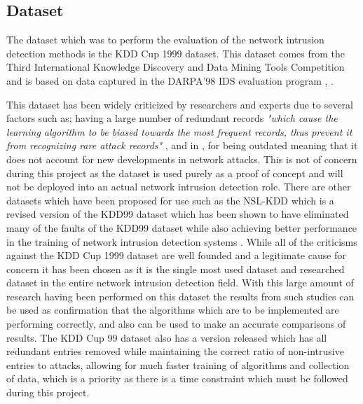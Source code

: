 	\subsection{Dataset}
	The dataset which was to perform the evaluation of the network intrusion detection methods is the KDD Cup 1999 dataset. This dataset comes from the Third International Knowledge Discovery and Data Mining Tools Competition and is based on data captured in the DARPA'98 IDS evaluation program \cite{Lippmann2000darpa}, \cite{tavallaee2009detailed}. 
	
	This dataset has been widely criticized by researchers and experts due to several factors such as; having a large number of redundant records \textit{"which  cause  the  learning  algorithm  to  be  biased  towards  the  most  frequent  records,  thus  prevent  it  from  recognizing  rare  attack  records"} \cite{panda2012hybrid} , and in \cite{vasudevan2011ssenet}, for being outdated meaning that it does not account for new developments in network attacks. This is not of concern during this project as the dataset is used purely as a proof of concept and will not be deployed into an actual network intrusion detection role. There are other datasets which have been proposed for use such as the NSL-KDD which is a revised version of the KDD99 dataset which has been shown to have eliminated many of the faults of the KDD99 dataset while also achieving better performance in the training of network intrusion detection systems \cite{dhanabal2015study}. While all of the criticisms against the KDD Cup 1999 dataset are well founded and a legitimate cause for concern it has been chosen as it is the single most used dataset and researched dataset in the entire network intrusion detection field. With this large amount of research having been performed on this dataset the results from such studies can be used as confirmation that the algorithms which are to be implemented are performing correctly, and also can be used to make an accurate comparisons of results. The KDD Cup 99 dataset also has a version released which has all redundant entries removed while maintaining the correct ratio of non-intrusive entries to attacks, allowing for much faster training of algorithms and collection of data, which is a priority as there is a time constraint which must be followed during this project.
	
